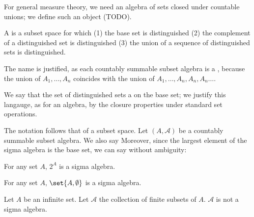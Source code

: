 \sbasic


\sstart



For general measure theory,
we need an algebra of sets
closed under countable unions;
we define such an object (TODO).


A 
is a subset space for which
(1) the base set is distinguished
(2) the complement of a distinguished
set is distinguished
(3) the union of a sequence of distinguished sets
is distinguished.

The name is justified, as
each countably summable subset algebra is a
,
because the union of $A_1, \dots, A_n$
coincides with the union of
$A_1, \dots, A_n, A_n, A_n \dots$.

We say that the set of distinguished
sets a  on the
base set; we justify this langauge, as for
an algebra, by the closure properties
under standard set operations.


The notation follows that of a subset space.
Let $(A, \mathcal{A})$ be a countably summable
subset algebra.
We also say 
Moreover, since the largest element of the
sigma algebra is the base set, we can say without
ambiguity: 


\begin{expl}
  For any set $A$, $2^{A}$ is a sigma algebra.
\end{expl}

\begin{expl}
  For any set $A$,
  $\set{A, \emptyset}$ is a sigma algebra.
\end{expl}

\begin{expl}
  Let $A$ be an infinite set.
  Let $\mathcal{A}$ the collection
  of finite subsets of $A$.
  $\mathcal{A}$ is not a sigma algebra.
\end{expl}

